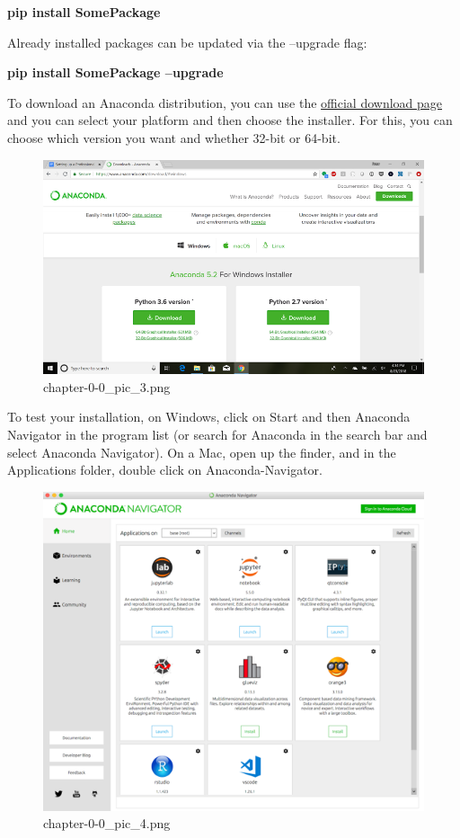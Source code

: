 \documentclass[11pt]{article}
\begin{document}
\textbf{pip install SomePackage}

Already installed packages can be updated via the --upgrade flag:

\textbf{pip install SomePackage --upgrade}

To download an Anaconda distribution, you can use the
\href{https://www.anaconda.com/download/}{official download page} and
you can select your platform and then choose the installer. For this,
you can choose which version you want and whether 32-bit or 64-bit.

    \begin{figure}
\centering
\includegraphics{./pic/chapter-0-0_pic_3.png}
\caption{chapter-0-0\_pic\_3.png}
\end{figure}

    To test your installation, on Windows, click on Start and then Anaconda
Navigator in the program list (or search for Anaconda in the search bar
and select Anaconda Navigator). On a Mac, open up the finder, and in the
Applications folder, double click on Anaconda-Navigator.

    \begin{figure}
\centering
\includegraphics{./pic/chapter-0-0_pic_4.png}
\caption{chapter-0-0\_pic\_4.png}
\end{figure}
\end{document}
